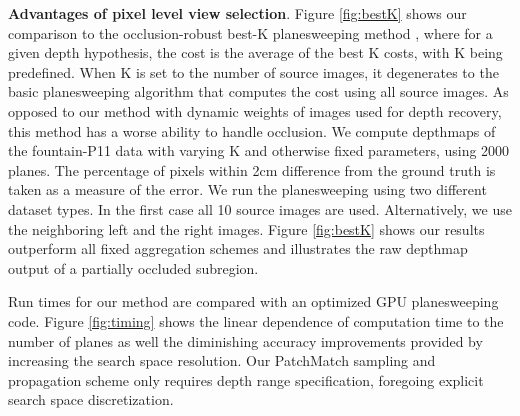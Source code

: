 {\bf Advantages of pixel level view selection}. Figure \ref{fig:bestK} shows our comparison to the occlusion-robust best-K planesweeping method \cite{handle_occlusion2001}, where
for a given depth hypothesis, the cost is the average of the best K costs, with K being predefined.
When K is set to the number of source images, it degenerates to the basic planesweeping algorithm that computes the cost using all source images.
As opposed to our method with dynamic weights of images used for depth recovery, this method has a worse ability to handle occlusion.
We compute depthmaps of the fountain-P11 data with varying K and otherwise fixed parameters, using 2000 planes.
The percentage of pixels within 2cm difference from the ground truth is taken as a measure of the error.
We run the planesweeping using two different dataset types. In the first case all 10 source images are used. Alternatively, we use the neighboring left and the right images.
Figure \ref{fig:bestK} shows our results outperform all fixed aggregation schemes and illustrates the raw depthmap output of a partially occluded subregion.



Run times for our method are compared with an optimized GPU planesweeping code.
Figure \ref{fig:timing} shows the linear dependence of computation time to the number of planes as well the diminishing accuracy improvements provided by increasing the search space resolution. Our PatchMatch sampling and propagation scheme only requires depth range specification, foregoing  explicit search space discretization.



